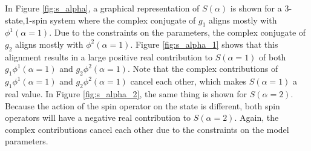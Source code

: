 \noindent
In Figure \ref{fig:s_alpha}, a graphical representation of $S({\alpha})$ is shown for a 3-state,1-spin system where the complex conjugate of $g_1$ aligns mostly with $\phi^1(\alpha=1)$.
Due to the constraints on the parameters, the complex conjugate of $g_2$ aligns mostly with $\phi^2(\alpha=1)$.
Figure \ref{fig:s_alpha_1} shows that this alignment results in a large positive real contribution to $S(\alpha = 1)$ of both $g_1 \phi^1(\alpha=1)$ and $g_2 \phi^2(\alpha=1)$. 
Note that the complex contributions of $g_1 \phi^1(\alpha=1)$ and $g_2 \phi^2(\alpha=1)$ cancel each other, which makes $S(\alpha=1)$ a real value.
In Figure \ref{fig:s_alpha_2}, the same thing is shown for $S(\alpha=2)$. Because the action of the spin operator on the state is different, both spin operators will have a negative real contribution to $S(\alpha=2)$.
Again, the complex contributions cancel each other due to the constraints on the model parameters.

